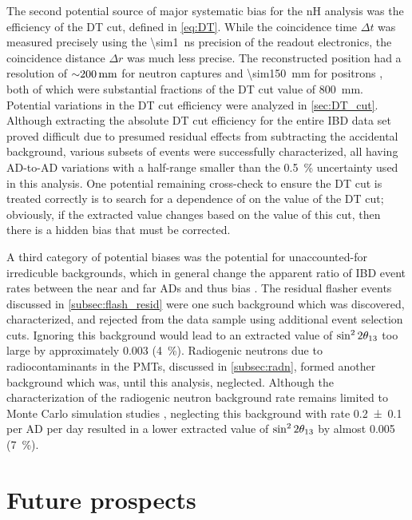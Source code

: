 The second potential source of major systematic bias for the nH analysis
was the efficiency of the DT cut, defined in \cref{eq:DT}.
While the coincidence time $\Delta t$ was measured precisely
using the \SI{\sim1}{\ns} precision of the readout electronics,
the coincidence distance $\Delta r$ was much less precise.
The reconstructed position had a resolution
of $\SI{\sim200}{\mm}$ for neutron captures
and \SI{\sim150}{\mm} for positrons \cite{adsimple1},
both of which were substantial fractions of the DT cut value of \SI{800}{\mm}.
Potential variations in the DT cut efficiency
were analyzed in \cref{sec:DT_cut}.
Although extracting the absolute DT cut efficiency
for the entire IBD data set proved difficult
due to presumed residual effects from subtracting the accidental background,
various subsets of events were successfully characterized,
all having AD-to-AD variations with a half-range smaller than
the \SI{0.5}{\percent} uncertainty used in this analysis.
One potential remaining cross-check to ensure the DT cut is treated correctly
is to search for a dependence of \thetaot{} on the value of the DT cut;
obviously, if the extracted value \thetaot{} changes
based on the value of this cut,
then there is a hidden bias that must be corrected.

A third category of potential biases
was the potential for unaccounted-for irredicuble backgrounds,
which in general change the apparent ratio of IBD event rates
between the near and far ADs and thus bias \thetaot{}.
The residual flasher events discussed in \cref{subsec:flash_resid}
were one such background which was discovered, characterized,
and rejected from the data sample using additional event selection cuts.
Ignoring this background would lead to an extracted value of $\sin^22\theta_{13}$
too large by approximately \num{0.003} (\SI{4}{\percent}).
Radiogenic neutrons due to radiocontaminants in the PMTs,
discussed in \cref{subsec:radn},
formed another background which was, until this analysis, neglected.
Although the characterization of the radiogenic neutron background rate
remains limited to Monte Carlo simulation studies \cite{rad_n},
neglecting this background with rate \num{0.2\pm0.1} per AD per day
resulted in a lower extracted value of $\sin^22\theta_{13}$
by almost \num{0.005} (\SI{7}{\percent}).

\section{Future prospects}
\label{sec:future}

